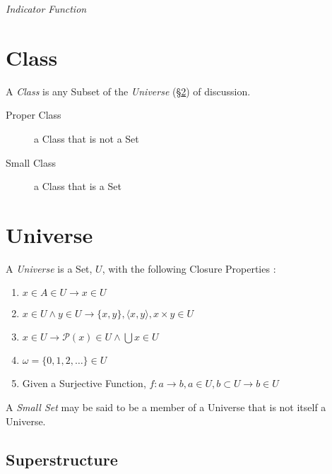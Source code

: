\emph{Indicator Function}



\section{Class}\label{sec:class}

A \emph{Class} is any Subset of the \emph{Universe}
(\S\ref{sec:set_universe}) of discussion.

\begin{description}
    \item [Proper Class] a Class that is not a Set
    \item [Small Class] a Class that is a Set
\end{description}



\section{Universe}\label{sec:set_universe}

A \emph{Universe} is a Set, $U$, with the following Closure Properties
\cite{maclane69}:
\begin{enumerate}
\item $x \in A \in U \rightarrow x \in U$
\item $x \in U \wedge y \in U \rightarrow \{x,y\}, \langle x,y
  \rangle, x \times y \in U$
\item $x \in U \rightarrow \mathcal{P}(x) \in U \wedge \bigcup x \in U$
\item $\omega = \{0,1,2,\ldots\} \in U$
\item Given a Surjective Function, $f : a \rightarrow b, a \in
  U, b \subset U \rightarrow b \in U$
\end{enumerate}
A \emph{Small Set} may be said to be a member of a Universe that is
not itself a Universe.



\subsection{Superstructure}\label{sec:superstructure}


